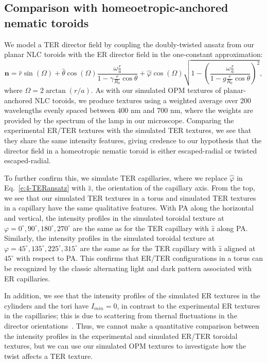 \subsection{Comparison with homeoetropic-anchored nematic toroids}
We model a TER director field by coupling the doubly-twisted ansatz from our planar NLC toroids with the ER director field in the one-constant approximation:
\begin{equation}
  \mathbf{n} = \hat{r} \sin(\Omega)
  + \hat{\theta}\cos(\Omega)\frac{\omega \frac{r}{a}}{1-\gamma \frac{r}{R_0} \cos \theta}
  + \hat{\varphi}\cos(\Omega)\sqrt{1 - \left ( \frac{\omega \frac{r}{a}}{1-g \frac{r}{R_0} \cos \theta} \right )^2 },\label{e:4-TERansatz}
\end{equation}
where $\Omega = 2 \arctan(r/a)$.
As with our simulated OPM textures of planar-anchored NLC toroids, we produce textures using a weighted average over 200 wavelengths evenly spaced between $400$ nm and $700$ nm, where the weights are provided by the spectrum of the lamp in our microscope.
Comparing the experimental ER/TER textures with the simulated TER textures, we see that they share the same intensity features, giving credence to our hypothesis that the director field in a homeotropic nematic toroid is either escaped-radial or twisted escaped-radial.

To further confirm this, we simulate TER capillaries, where we replace $\hat{\varphi}$ in Eq.~\ref{e:4-TERansatz} with $\hat{z}$, the orientation of the capillary axis.
From the top, we see that our simulated TER textures in a torus and simulated TER textures in a capillary have the same qualitative features.
With PA along the horizontal and vertical, the intensity profiles in the simulated toroidal texture at $\varphi = 0^{\circ},90^{\circ},180^{\circ},270^{\circ}$ are the same as for the TER capillary with $\hat{z}$ along PA.
Similarly, the intensity profiles in the simulated toroidal texture at $\varphi = 45^{\circ},135^{\circ},225^{\circ},315^{\circ}$ are the same as for the TER capillary with $\hat{z}$ aligned at $45^{\circ}$ with respect to PA.
This confirms that ER/TER configurations in a torus can be recognized by the classic alternating light and dark pattern associated with ER capillaries.

In addition, we see that the intensity profiles of the simulated ER textures in the  cylinders and the tori have $I_{min} = 0$, in contrast to the experimental ER textures in the capillaries; this is due to scattering from thernal fluctuations in the director orientations~\cite{RN33}.
Thus, we cannot make a quantitative comparison between the intensity profiles in the experimental and simulated ER/TER toroidal textures, but we can use our simulated OPM textures to investigate how the twist affects a TER texture.


